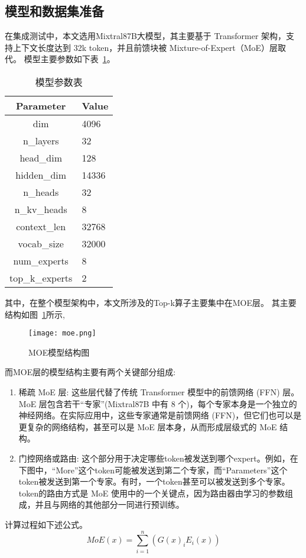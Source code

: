 \subsection{模型和数据集准备}
在集成测试中，本文选用Mixtral8\times7B大模型，其主要基于 Transformer 架构，支持上下文长度达到 32k token，并且前馈块被 Mixture-of-Expert（MoE）层取代。
模型主要参数如下表~\ref{tab:model}。
\begin{table}
    \centering
    \caption{模型参数表}
    \label{tab:model}
    \begin{tabular}{cl}
        \toprule
        Parameter       &Value   \\
        \midrule
        dim & 4096 \\
        n\_layers & 32 \\
        head\_dim & 128 \\
        hidden\_dim & 14336 \\
        n\_heads & 32 \\
        n\_kv\_heads & 8 \\
        context\_len & 32768 \\
        vocab\_size & 32000 \\
        num\_experts & 8 \\
        top\_k\_experts & 2 \\
        \bottomrule
    \end{tabular}
    \end{table}

    其中，在整个模型架构中，本文所涉及的Top-k算子主要集中在MOE层。
    其主要结构如图~\ref{fig:moe}所示,
\begin{figure}[ht]
    \centering
    \texttt{[image: moe.png]}
    \caption{MOE模型结构图}
    \label{fig:moe}
\end{figure}

而MOE层的模型结构主要有两个关键部分组成:
\begin{enumerate}
    \item{稀疏 MoE 层}: 这些层代替了传统 Transformer 模型中的前馈网络 (FFN) 层。MoE 层包含若干“专家”(Mixtral8\times7B 中有 8 个)，每个专家本身是一个独立的神经网络。在实际应用中，这些专家通常是前馈网络 (FFN)，但它们也可以是更复杂的网络结构，甚至可以是 MoE 层本身，从而形成层级式的 MoE 结构。
    \item {门控网络或路由}:
    这个部分用于决定哪些token被发送到哪个expert。例如，在下图中，“More”这个token可能被发送到第二个专家，而“Parameters”这个token被发送到第一个专家。有时，一个token甚至可以被发送到多个专家。token的路由方式是 MoE 使用中的一个关键点，因为路由器由学习的参数组成，并且与网络的其他部分一同进行预训练。
\end{enumerate}
计算过程如下述公式。
\begin{equation}
MoE(x) = \sum_{i = 1}^{n} (G(x)_i E_i(x))
\end{equation}

